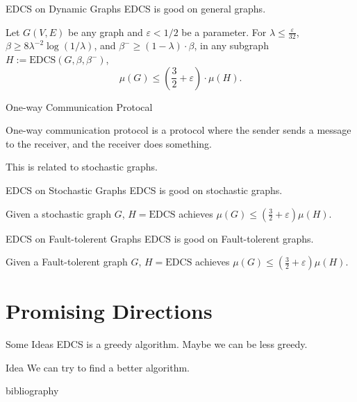 \documentclass{beamer}
\newcommand{\EDCS}{\text{EDCS}}
\begin{document}
\begin{frame}{EDCS on Dynamic Graphs}
    EDCS is good on general graphs.
    \begin{lemma}[\cite{AB19}]
        Let $G(V, E)$ be any graph and $\varepsilon < 1/2$ be a parameter. 
        For $\lambda \leq \frac{\varepsilon}{32}$, $\beta \geq 8 \lambda^{-2} \log(1/\lambda)$, and $\beta^{-} \geq (1 - \lambda) \cdot \beta$, 
        in any subgraph $H := \mathrm{EDCS}(G, \beta, \beta^-)$, $$\mu(G) \leq \left(\frac{3}{2} + \varepsilon\right) \cdot \mu(H).$$
    \end{lemma}
\end{frame}

\begin{frame}{One-way Communication Protocal}
    \begin{definition}
        One-way communication protocol is a protocol where the sender sends a message to the receiver, 
        and the receiver does something.
    \end{definition}
    This is related to stochastic graphs.
\end{frame}

\begin{frame}{EDCS on Stochastic Graphs}
    EDCS is good on stochastic graphs.
    \begin{lemma}
        Given a stochastic graph $G$, $H=\EDCS$ achieves $\mu(G)\leq\left( \frac{3}{2}+\varepsilon \right)\mu(H)$.
    \end{lemma}
\end{frame}

\begin{frame}{EDCS on Fault-tolerent Graphs}
    EDCS is good on Fault-tolerent graphs.
    \begin{lemma}
        Given a Fault-tolerent graph $G$, $H=\EDCS$ achieves $\mu(G)\leq\left( \frac{3}{2}+\varepsilon \right)\mu(H)$.
    \end{lemma}
\end{frame}

\section{Promising Directions}
\begin{frame}{Some Ideas}
    EDCS is a greedy algorithm. Maybe we can be less greedy.
    \begin{block}{Idea}
        We can try to find a better algorithm.        
    \end{block}
\end{frame} 

\begin{frame}{bibliography}
    \printbibliography
\end{frame}
\end{document}
